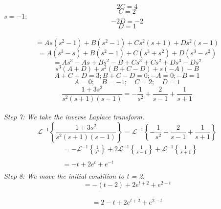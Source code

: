 \documentclass{article}
\begin{document}
    $$2C = 4$$
    $$C = 2$$
    $s = -1:$
    $$-2D = -2$$
    $$D = 1$$
     \\
    $$= As(s^{2} - 1) + B(s^{2} - 1) + Cs^{2}(s + 1) + Ds^{2}(s - 1)$$
    $$= A(s^{3} - s) + B(s^{2} - 1) + C(s^{3} + s^{2}) + D(s^{3} - s^{2})$$
    $$= As^{3} - As + Bs^{2} - B + Cs^{3} + Cs^{2} + Ds^{3} - Ds^{2}$$
    $$s^{3}(A + D) + s^{2}(B + C - D) + s(-A) - B$$
    $$A + C + D = 3; B + C - D = 0; -A = 0; -B = 1$$
    $$A = 0;\quad B = -1;\quad C = 2;\quad D = 1$$
    $$\frac{1 + 3s^{2}}{s^{2}(s + 1)(s - 1)} = -\frac{1}{s^{2}} + \frac{2}{s - 1} + \frac{1}{s + 1}$$ \\
    \textit{Step 7: We take the inverse Laplace transform.} \\
    $$\mathcal{L}^{-1} \left\{\frac{1 + 3s^{2}}{s^{2}(s + 1)(s - 1)}\right\} = \mathcal{L}^{-1} \left\{-\frac{1}{s^{2}} + \frac{2}{s - 1} + \frac{1}{s + 1}\right\}$$
    \begin{align*}
        &= -\mathcal{L}^{-1} \left\{\frac{1}{s^{2}}\right\} + 2\mathcal{L}^{-1} \left\{\frac{1}{s - 1}\right\} + \mathcal{L}^{-1} \left\{\frac{1}{s + 1}\right\} \\ \\
        &= -t + 2e^{t} + e^{-t}\\
    \end{align*}
    \textit{Step 8: We move the initial condition to t = 2.} \\
    $$=-(t - 2) + 2e^{t + 2} + e^{2 - t}$$ \\
    $$= 2 -t + 2e^{t + 2} + e^{2 - t}$$
    \newpage
\end{document}
